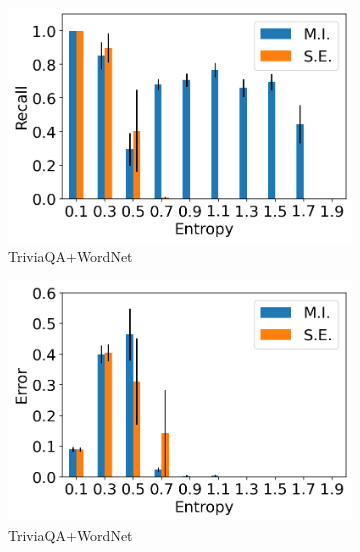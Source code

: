 \documentclass[a4paper]{article}
\theoremstyle{plain}
\theoremstyle{definition}
\theoremstyle{plain}
\begin{document}
\begin{figure}[t]
  \begin{subfigure}{0.24\textwidth}
       \includegraphics[width=\textwidth]{recall-TriviaQA.png}
    \caption{TriviaQA+WordNet} \label{fig:REa}
  \end{subfigure}%
  \hspace*{\fill}   %
  \begin{subfigure}{0.24\textwidth}
       \includegraphics[width=\textwidth]{error-TriviaQA.png}     
       \caption{TriviaQA+WordNet} \label{fig:REb}
  \end{subfigure}%
  \hspace*{\fill}   %
  \begin{subfigure}{0.24\textwidth}

\end{subfigure}
\end{figure}
\end{document}
